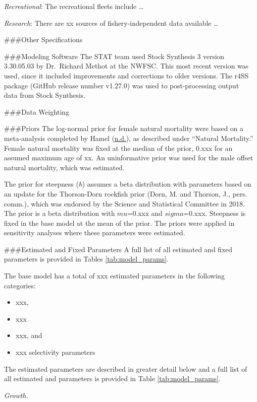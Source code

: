 \documentclass[12pt,]{article}
\begin{document}
\emph{Recreational}: The recreational fleets include \ldots{}

\emph{Research}: There are xx sources of fishery-independent data
available \ldots{}

\#\#\#Other Specifications

\#\#\#Modeling Software The STAT team used Stock Synthesis 3 version
3.30.05.03 by Dr.~Richard Methot at the NWFSC. This most recent version
was used, since it included improvements and corrections to older
versions. The r4SS package (GitHub release number v1.27.0) was used to
post-processing output data from Stock Synthesis.

\#\#\#Data Weighting

\#\#\#Priors The log-normal prior for female natural mortality were
based on a meta-analysis completed by Hamel
(\protect\hyperlink{ref-Hamel2015}{n.d.}), as described under ``Natural
Mortality.'' Female natural mortality was fixed at the median of the
prior, 0.xxx for an assumed maximum age of xx. An uninformative prior
was used for the male offset natural mortality, which was estimated.

The prior for steepness (\emph{h}) assumes a beta distribution with
parameters based on an update for the Thorson-Dorn rockfish prior (Dorn,
M. and Thorson, J., pers. comm.), which was endorsed by the Science and
Statistical Committee in 2018. The prior is a beta distribution with
\(mu\)=0.xxx and \(sigma\)=0.xxx. Steepness is fixed in the base model
at the mean of the prior. The priors were applied in sensitivity
analyses where these parameters were estimated.

\#\#\#Estimated and Fixed Parameters A full list of all estimated and
fixed parameters is provided in Tables \ref{tab:model_params}.

The base model has a total of xxx estimated parameters in the following
categories:

\begin{itemize}
  \item xxx,
  \item xxx
  \item xxx, and
  \item xxx selectivity parameters
\end{itemize}

The estimated parameters are described in greater detail below and a
full list of all estimated and parameters is provided in Table
\ref{tab:model_params}.

\emph{Growth.}
\end{document}
